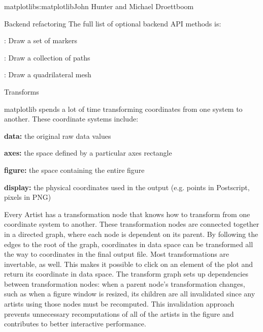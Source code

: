 \begin{aosachapter}{matplotlib}{s:matplotlib}{John Hunter and Michael Droettboom}
\begin{aosasect1}{Backend refactoring}
The full list of optional backend API methods is:

\begin{aosaitemize}

  \item {}: Draw a set of markers

  \item {}: Draw a collection of paths

  \item {}: Draw a quadrilateral mesh

\end{aosaitemize}

\end{aosasect1}

\begin{aosasect1}{Transforms}


matplotlib spends a lot of time transforming coordinates from one
system to another.  These coordinate systems include:

\begin{aosaitemize}
\item \textbf{data:} the original raw data values

\item \textbf{axes:} the space defined by a particular axes rectangle

\item \textbf{figure:} the space containing the entire figure

\item \textbf{display:} the physical coordinates used in the output
  (e.g. points in Postscript, pixels in PNG)
\end{aosaitemize}

Every Artist has a transformation node that knows how to transform
from one coordinate system to another.  These transformation nodes are
connected together in a directed graph, where each node is dependent
on its parent.  By following the edges to the root of the graph,
coordinates in data space can be transformed all the way to
coordinates in the final output file.  Most transformations are
invertable, as well.  This makes it possible to click on an element of
the plot and return its coordinate in data space.  The transform graph
sets up dependencies between transformation nodes: when a parent
node's transformation changes, such as when a figure window is
resized, its children are all invalidated since any artists using
those nodes must be recomputed.  This invalidation approach prevents
unnecessary recomputations of all of the artists in the figure and
contributes to better interactive performance.


\end{aosasect1}
\end{aosachapter}
